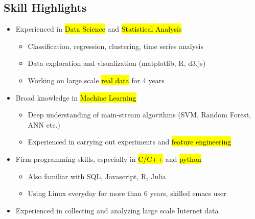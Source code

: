 \begin{resume}







\section{Skill Highlights}
\begin{itemize}
\item Experienced in \hl{Data Science} and \hl{Statistical Analysis}
  \begin{itemize}
  \item Classification, regression, clustering, time series analysis
  \item Data exploration and visualization (matplotlib, R, d3.js)
  \item Working on large scale \hl{real data} for 4 years
  \end{itemize}
\item Broad knowledge in \hl{Machine Learning}
  \begin{itemize}
  \item Deep understanding of main-stream algorithms (SVM, Random Forest, ANN etc.)
  \item Experienced in carrying out experiments and \hl{feature engineering}
  \end{itemize}
\item Firm programming skills, especially in \hl{C/C++} and \hl{python}
  \begin{itemize}
    \item Also familiar with SQL, Javascript, R, Julia
    \item Using Linux everyday for more than 6 years, skilled emacs user
  \end{itemize}      
\item Experienced in collecting and analyzing large scale Internet data

\end{itemize}
\end{resume}
